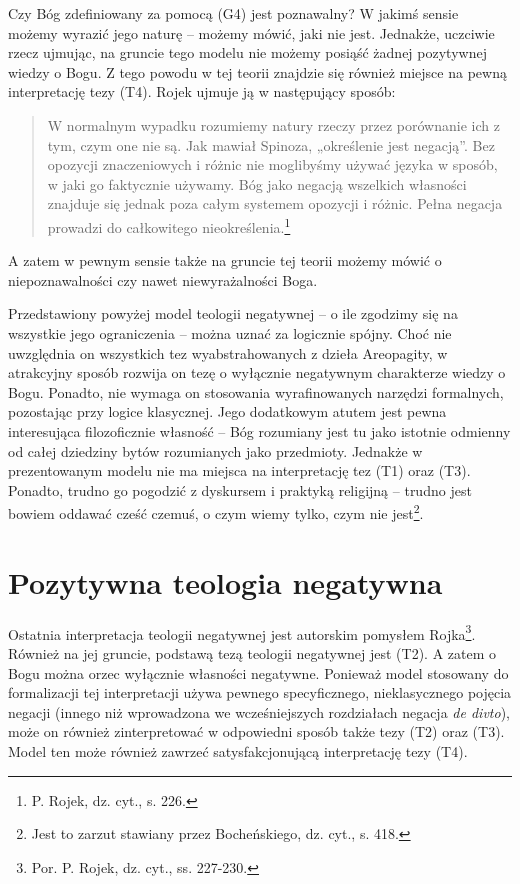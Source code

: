 Czy Bóg zdefiniowany za pomocą (G4) jest poznawalny? W jakimś sensie
możemy wyrazić jego naturę -- możemy mówić, jaki nie jest. Jednakże,
uczciwie rzecz ujmując, na gruncie tego modelu  nie możemy posiąść
żadnej pozytywnej wiedzy o Bogu. Z tego powodu w tej teorii znajdzie
się również miejsce na pewną interpretację tezy (T4). Rojek ujmuje ją w
następujący sposób:



\begin{quote}
    W normalnym wypadku rozumiemy natury rzeczy przez porównanie ich z tym,
czym one nie są. Jak mawiał Spinoza, „określenie jest negacją”. Bez
opozycji znaczeniowych i różnic nie moglibyśmy używać języka w sposób,
w jaki go faktycznie używamy. Bóg jako negacją wszelkich własności
znajduje się jednak poza całym systemem opozycji i różnic. Pełna
negacja prowadzi do całkowitego nieokreślenia.\footnote{P. Rojek, dz.
cyt., s. 226. }
\end{quote}




A zatem w pewnym sensie także na gruncie tej teorii możemy mówić o
niepoznawalności czy nawet niewyrażalności Boga.

Przedstawiony powyżej model teologii negatywnej -- o ile zgodzimy się na
wszystkie jego ograniczenia -- można uznać za logicznie spójny. Choć nie
uwzględnia on wszystkich tez wyabstrahowanych z dzieła Areopagity, w
atrakcyjny sposób rozwija on tezę o wyłącznie negatywnym charakterze
wiedzy o Bogu. Ponadto, nie wymaga on stosowania wyrafinowanych
narzędzi formalnych, pozostając przy logice klasycznej. Jego dodatkowym
atutem jest pewna interesująca filozoficznie własność -- Bóg rozumiany
jest tu jako istotnie odmienny od całej dziedziny bytów rozumianych
jako przedmioty. Jednakże w prezentowanym modelu nie ma miejsca na
interpretację tez (T1) oraz (T3). Ponadto, trudno go pogodzić z
dyskursem i praktyką religijną -- trudno jest bowiem oddawać cześć
czemuś, o czym wiemy tylko, czym nie jest\footnote{Jest to zarzut
stawiany przez Bocheńskiego, dz. cyt., s. 418. }.



\section{Pozytywna teologia negatywna}

Ostatnia interpretacja teologii negatywnej jest autorskim pomysłem
Rojka\footnote{Por. P. Rojek, dz. cyt., ss. 227-230. }. Również na
jej gruncie, podstawą tezą teologii negatywnej jest (T2). A zatem o
Bogu można orzec wyłącznie własności negatywne. Ponieważ model
stosowany do formalizacji tej interpretacji używa pewnego
specyficznego, nieklasycznego pojęcia negacji (innego niż wprowadzona
we wcześniejszych rozdziałach negacja \textit{de divto}), może on
również zinterpretować w odpowiedni sposób także tezy (T2) oraz (T3).
Model ten może również zawrzeć satysfakcjonującą interpretację tezy
(T4).

